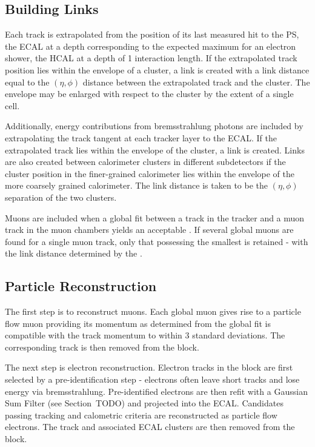 \subsection{Building Links}
Each track is extrapolated from the position of its last measured hit to the
\ac{PS}, the \ac{ECAL} at a depth corresponding to the expected maximum for an
electron shower, the \ac{HCAL} at a depth of 1 interaction length. If the
extrapolated track position lies within the envelope of a cluster, a link is
created with a link distance equal to the $(\eta, \phi)$ distance between the
extrapolated track and the cluster. The envelope may be enlarged with respect to
the cluster by the extent of a single cell.

Additionally, energy contributions from bremsstrahlung photons are included by
extrapolating the track tangent at each tracker layer to the \ac{ECAL}. If the
extrapolated track lies within the envelope of the cluster, a link is created.
Links are also created between calorimeter clusters in different subdetectors if
the cluster position in the finer-grained calorimeter lies within the envelope
of the more coarsely grained calorimeter. The link distance is taken to be the
$(\eta, \phi)$ separation of the two clusters.

Muons are included when a global fit between a track in the tracker and a muon
track in the muon chambers yields an acceptable \chisq. If several global muons
are found for a single muon track, only that possessing the smallest \chisq is
retained - with the link distance determined by the \chisq.

\subsection{Particle Reconstruction}
The first step is to reconstruct muons. Each global muon gives rise to a
particle flow muon providing its momentum as determined from the global fit is
compatible with the track momentum to within 3 standard deviations. The
corresponding track is then removed from the block.

The next step is electron reconstruction. Electron tracks in the block are first
selected by a pre-identification step - electrons often leave short tracks and
lose energy via bremsstrahlung. Pre-identified electrons are then refit with a
Gaussian Sum Filter (see Section~TODO) and projected into the \ac{ECAL}.
Candidates passing tracking and calometric criteria are reconstructed as
particle flow electrons. The track and associated \ac{ECAL} clusters are then
removed from the block.

